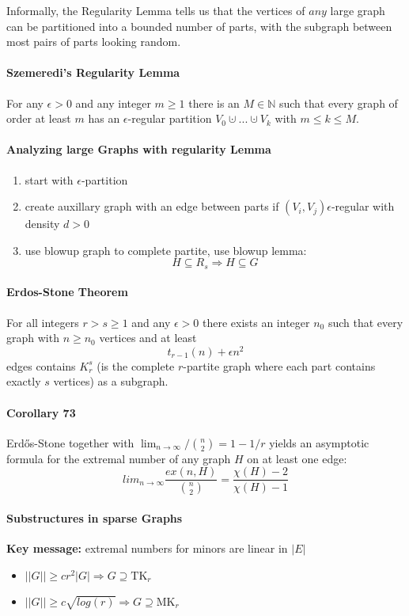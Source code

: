 \bigskip \noindent
Informally, the Regularity Lemma tells us that the vertices of $ any $ large 
graph can be partitioned into a bounded number of parts, with the subgraph 
between most pairs of parts looking random.

\paragraph{Szemeredi's Regularity Lemma} For any $\epsilon > 0 $ and any 
integer $ m \geq 1 $ there is an $ M \in \mathbb{N} $ such that every graph 
of order at least $ m $ has an $\epsilon$-regular partition 
$V_0 \cupdot...\cupdot V_k$ with $ m\leq k \leq M $.

\paragraph{Analyzing large Graphs with regularity Lemma}
\begin{enumerate}
    \item start with $\epsilon$-partition
    \item create auxillary graph with an edge between parts 
    if $(V_i,V_j) \epsilon$-regular with density $d > 0$
    \item use blowup graph to complete partite, use blowup lemma:
    $$ H \subseteq R_s \Rightarrow H \subseteq G $$
\end{enumerate}

\paragraph{Erdos-Stone Theorem} For all integers $ r > s \geq 1 $ and any 
$ \epsilon > 0 $ there exists an integer $ n_0 $ such that every graph with 
$n \geq n_0$ vertices and at least
$$ t_{r-1}(n) + \epsilon n^2 $$
edges contains $ K^s_r $ (is the complete $r$-partite graph where each 
part contains exactly $ s $ vertices) as a subgraph.

\paragraph{Corollary 73} Erd\H{o}s-Stone together with 
$ \lim_{n\to\infty} / \binom{n}{2} = 1 - 1 / r $ yields an asymptotic formula 
for the extremal number of any graph $ H $ on at least one edge:
$$ lim_{n\to\infty} \frac{ex(n,H)}{\binom{n}{2}} = \frac{\chi(H)-2}{\chi(H)-1} $$

\paragraph{Substructures in sparse Graphs}
\textbf{Key message:} extremal numbers for minors are linear in $|E|$
\begin{itemize}
    \item $||G|| \geq cr^2|G| \Rightarrow G \supseteq \text{TK}_r $
    \item $||G|| \geq c\sqrt{log(r)} \Rightarrow G \supseteq \text{MK}_r $
\end{itemize}